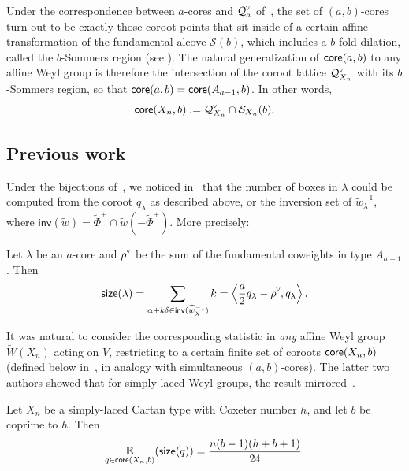 \documentclass[ALCO,published]{cedram}
\newcommand{\chk}[1]{#1^{\normalfont\smash{\scalebox{.5}[.5]{\rotatebox{90}{\textbf{\textless}}}}}}
\newcommand{\Expt}[2]{\operatorname*{\mathbb{E}}\limits_{#1}(#2)}
\newcommand{\wa}{\widetilde{W}}
\newcommand{\wphi}{\widetilde{\Phi}}
\newcommand{\Q}{\mathcal{Q}}
\newcommand{\Sommers}{\mathcal{S}}
\newcommand{\core}{{\sf core}}
\newcommand{\waf}{\widetilde{w}}
\newcommand{\size}{{\sf size}}
\begin{document}
Under the correspondence between $a$-cores and $\chk{\Q}_{a}$ of~, the set of $(a,b)$-cores turn out to be exactly those coroot points that sit inside of a certain affine transformation of the fundamental alcove $\Sommers(b)$, which includes a $b$-fold dilation, called the $b$-Sommers region (see ).  The natural generalization of $\core(a,b)$ to any affine Weyl group is therefore the intersection of the coroot lattice $\chk{\Q}_{X_n}$ with its $b$-Sommers region, so that $\core(a,b) = \core(A_{a-1},b)$. In other words,
\begin{equation}
\label{eq:Wcores}
    \core(X_n,b) := \chk{\Q}_{X_n} \cap \Sommers_{X_n}(b).
\end{equation}


\subsection{Previous work}

Under the bijections of~, we noticed in~\cite{thiel2017strange} that the number of boxes in $\lambda$ could be computed from the coroot $q_\lambda$ as described above, or the inversion set of $\waf_\lambda^{-1}$, where $\mathsf{inv}(\waf)=\wphi^+ \cap \waf(-\wphi^+)$. More precisely:

\begin{prop} Let $\lambda$ be an $a$-core and $\chk{\rho}$ be the sum of the fundamental coweights in type $A_{a-1}$. Then
$$\size(\lambda) = \sum\limits_{\alpha+k\delta\in\mathsf{inv}(\waf^{-1}_\lambda)}k = \left\langle \frac{a}{2}q_{\lambda} - \chk{\rho},q_\lambda \right\rangle.$$
\end{prop}
It was natural to consider the corresponding statistic in \emph{any} affine Weyl group $\wa(X_n)$ acting on $V$, restricting to a certain finite set of coroots $\core(X_n,b)$ (defined below in~, in analogy with simultaneous $(a,b)$-cores).  The latter two authors showed that for simply-laced Weyl groups, the result mirrored~.

\begin{theorem}
\label{thm:us}
Let $X_n$ be a simply-laced Cartan type with Coxeter number $h$, and let $b$ be coprime to $h$.  Then
\begin{equation*} \Expt{q \in \core(X_n,b)}{\size(q)} = \frac{n(b-1)(h+b+1)}{24}. \end{equation*}
\end{theorem}
\end{document}
